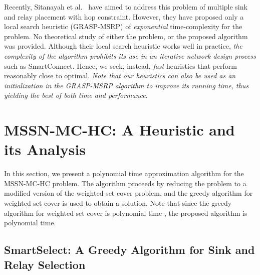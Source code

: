 \documentclass[conference]{IEEEtran}
\begin{document}
Recently, Sitanayah et al.\ \cite{sitanayah} have aimed to address this problem of multiple sink and relay placement with hop constraint. However, they have proposed only a local search heuristic (GRASP-MSRP) of \emph{exponential} time-complexity for the problem. No theoretical study of either the problem, or the proposed algorithm was provided. Although their local search heuristic works well in practice, \emph{the complexity of the algorithm prohibits its use in an iterative network design process} such as SmartConnect\cite{smartconnect-paper}. Hence, we seek, instead, \emph{fast} heuristics that perform reasonably close to optimal. \emph{Note that our heuristics can also be used as an initialization in the GRASP-MSRP algorithm \cite{sitanayah} to improve its running time, thus yielding the best of both time and performance}.

\section{MSSN-MC-HC: A Heuristic and its Analysis}
\label{sec:smartselect}
In this section, we present a polynomial time approximation algorithm for the MSSN-MC-HC problem. The algorithm proceeds by reducing the problem to a modified version of the weighted set cover problem, and the greedy algorithm for weighted set cover is used to obtain a solution. Note that since the greedy algorithm for weighted set cover is polynomial time \cite{vazirani}, the proposed algorithm is polynomial time. 

\subsection{SmartSelect: A Greedy Algorithm for Sink and Relay Selection}
\end{document}
